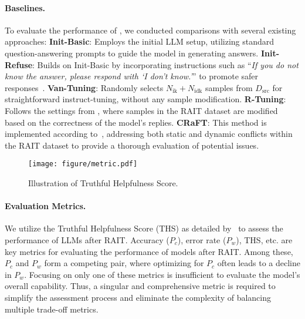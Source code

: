 \paragraph{Baselines.}
To evaluate the performance of \M, we conducted comparisons with several existing approaches:
\textbf{Init-Basic}: Employs the initial LLM setup, utilizing standard question-answering prompts to guide the model in generating answers.
\textbf{Init-Refuse}: Builds on Init-Basic by incorporating instructions such as ``\textit{If you do not know the answer, please respond with `I don't know.'}'' to promote safer responses~\cite{bianchi2024safetytunedllamaslessonsimproving,zhangdefending}.
\textbf{Van-Tuning}: Randomly selects \(N_{\text{ik}} + N_{\text{idk}}\) samples from \(D_{\text{src}}\) for straightforward instruct-tuning, without any sample modification.
\textbf{R-Tuning}: Follows the settings from \cite{R_Tuning}, where samples in the RAIT dataset are modified based on the correctness of the model's replies.
\textbf{CRaFT}: This method is implemented according to~\cite{zhu2024utilizeflowsteppingriver}, addressing both static and dynamic conflicts within the RAIT dataset to provide a thorough evaluation of potential issues.

\begin{figure}[t]
    \centering
    \texttt{[image: figure/metric.pdf]}
    \caption{Illustration of Truthful Helpfulness Score.}
    \label{fig:metric}
\end{figure}

\paragraph{Evaluation Metrics.}

We utilize the Truthful Helpfulness Score (THS) as detailed by~\cite{zhu2024utilizeflowsteppingriver} to assess the performance of LLMs after RAIT. Accuracy (\(P_c\)), error rate (\(P_w\)), THS, etc. are key metrics for evaluating the performance of models after RAIT. Among these, \(P_c\) and \(P_w\) form a competing pair, where optimizing for \(P_c\) often leads to a decline in \(P_w\). Focusing on only one of these metrics is insufficient to evaluate the model’s overall capability.
Thus, a singular and comprehensive metric is required to simplify the assessment process and eliminate the complexity of balancing multiple trade-off metrics.

